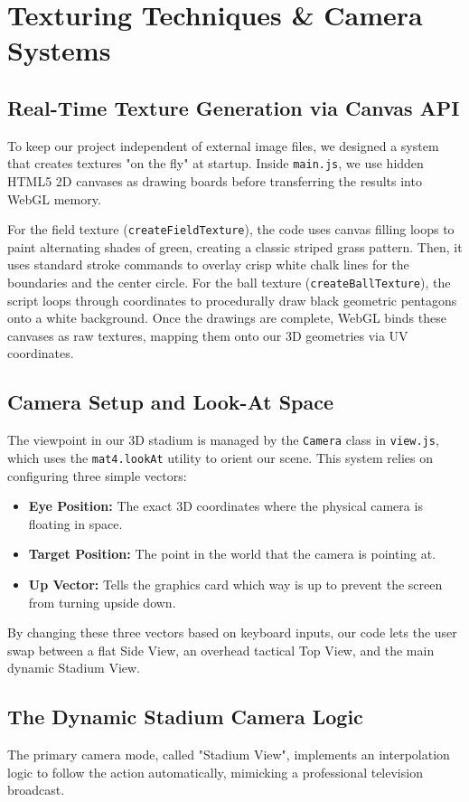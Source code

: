\chapter{Texturing Techniques \& Camera Systems}

\section{Real-Time Texture Generation via Canvas API}
To keep our project independent of external image files, we designed a system that creates textures "on the fly" at startup. Inside \texttt{main.js}, we use hidden HTML5 2D canvases as drawing boards before transferring the results into WebGL memory.

For the field texture (\texttt{createFieldTexture}), the code uses canvas filling loops to paint alternating shades of green, creating a classic striped grass pattern. Then, it uses standard stroke commands to overlay crisp white chalk lines for the boundaries and the center circle. For the ball texture (\texttt{createBallTexture}), the script loops through coordinates to procedurally draw black geometric pentagons onto a white background. Once the drawings are complete, WebGL binds these canvases as raw textures, mapping them onto our 3D geometries via UV coordinates.

\section{Camera Setup and Look-At Space}
The viewpoint in our 3D stadium is managed by the \texttt{Camera} class in \texttt{view.js}, which uses the \texttt{mat4.lookAt} utility to orient our scene. This system relies on configuring three simple vectors:
\begin{itemize}
    \item \textbf{Eye Position:} The exact 3D coordinates where the physical camera is floating in space.
    \item \textbf{Target Position:} The point in the world that the camera is pointing at.
    \item \textbf{Up Vector:} Tells the graphics card which way is up to prevent the screen from turning upside down.
\end{itemize}

By changing these three vectors based on keyboard inputs, our code lets the user swap between a flat Side View, an overhead tactical Top View, and the main dynamic Stadium View.

\section{The Dynamic Stadium Camera Logic}
The primary camera mode, called "Stadium View", implements an interpolation logic to follow the action automatically, mimicking a professional television broadcast. 

